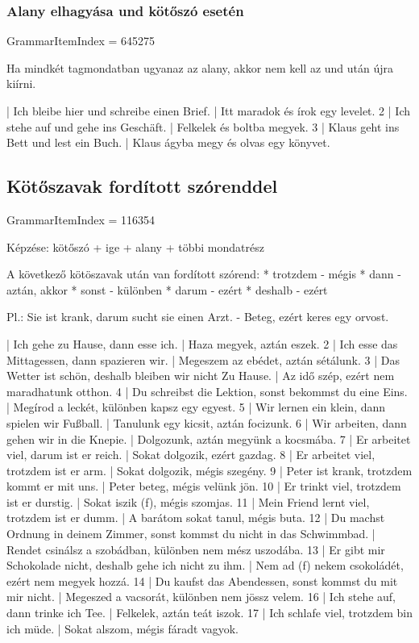 \documentclass{article}
\newenvironment{desc}{\verbatim}{\endverbatim}
\newenvironment{exmp}{\verbatim}{\endverbatim}
\begin{document}
\subsubsection{Alany elhagyása und kötőszó esetén}

GrammarItemIndex = 645275

\begin{desc}
Ha mindkét tagmondatban ugyanaz az alany, akkor nem kell az und után újra kiírni.
\end{desc}

\begin{exmp}
1 | Ich bleibe hier und schreibe einen Brief. | Itt maradok és írok egy levelet.
2 | Ich stehe auf und gehe ins Geschäft. | Felkelek és boltba megyek.
3 | Klaus geht ins Bett und lest ein Buch. | Klaus ágyba megy és olvas egy könyvet.
\end{exmp}

\subsection{Kötőszavak fordított szórenddel}

GrammarItemIndex = 116354

\begin{desc}
Képzése: kötőszó + ige + alany + többi mondatrész

A következő kötöszavak után van fordított szórend:
* trotzdem - mégis
* dann - aztán, akkor
* sonst - különben
* darum - ezért
* deshalb - ezért

Pl.: Sie ist krank, darum sucht sie einen Arzt. - Beteg, ezért keres egy orvost.
\end{desc}

\begin{exmp}
1 | Ich gehe zu Hause, dann esse ich. | Haza megyek, aztán eszek.
2 | Ich esse das Mittagessen, dann spazieren wir. | Megeszem az ebédet, aztán sétálunk.
3 | Das Wetter ist schön, deshalb bleiben wir nicht Zu Hause. | Az idő szép, ezért nem maradhatunk otthon.
4 | Du schreibst die Lektion, sonst bekommst du eine Eins. | Megírod a leckét, különben kapsz egy egyest.
5 | Wir lernen ein klein, dann spielen wir Fußball. | Tanulunk egy kicsit, aztán focizunk.
6 | Wir arbeiten, dann gehen wir in die Knepie. | Dolgozunk, aztán megyünk a kocsmába.
7 | Er arbeitet viel, darum ist er reich. | Sokat dolgozik, ezért gazdag.
8 | Er arbeitet viel, trotzdem ist er arm. | Sokat dolgozik, mégis szegény.
9 | Peter ist krank, trotzdem kommt er mit uns. | Peter beteg, mégis velünk jön.
10 | Er trinkt viel, trotzdem ist er durstig. | Sokat iszik (f), mégis szomjas.
11 | Mein Friend lernt viel, trotzdem ist er dumm. | A barátom sokat tanul, mégis buta.
12 | Du machst Ordnung in deinem Zimmer, sonst kommst du nicht in das Schwimmbad. | Rendet csinálsz a szobádban, különben nem mész uszodába.
13 | Er gibt mir Schokolade nicht, deshalb gehe ich nicht zu ihm. | Nem ad (f) nekem csokoládét, ezért nem megyek hozzá.
14 | Du kaufst das Abendessen, sonst kommst du mit mir nicht. | Megeszed a vacsorát, különben nem jössz velem.
16 | Ich stehe auf, dann trinke ich Tee. | Felkelek, aztán teát iszok.
17 | Ich schlafe viel, trotzdem bin ich müde. | Sokat alszom, mégis fáradt vagyok.
\end{exmp}
\end{document}
